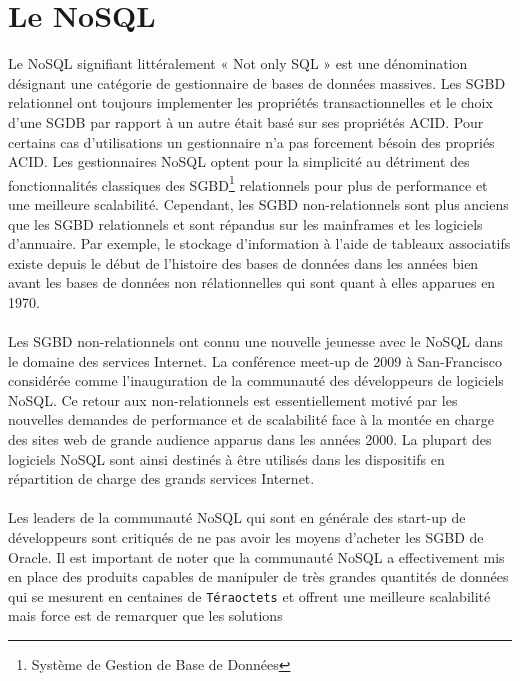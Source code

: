 \section{Le \textsf{NoSQL}}

Le \textsf{NoSQL} signifiant littéralement « \textsf{Not only SQL} » est une
dénomination désignant une catégorie de gestionnaire de bases de
données massives. Les SGBD relationnel ont toujours implementer les propriétés transactionnelles et le choix d'une SGDB par rapport à un autre était basé sur ses propriétés ACID. Pour certains cas d'utilisations un gestionnaire n'a pas forcement bésoin des propriés ACID. Les gestionnaires \textsf{NoSQL} optent pour la
simplicité au détriment des fonctionnalités classiques des
\textsf{SGBD}\footnote{Système de Gestion de Base de Données}
relationnels pour plus de performance et une meilleure
scalabilité. Cependant, les \textsf{SGBD} non-relationnels
sont plus anciens que les \textsf{SGBD} relationnels et sont répandus
sur les mainframes et les logiciels d'annuaire. Par exemple, le
stockage d'information à l'aide de tableaux associatifs existe depuis
le début de l'histoire des bases de données dans les années bien avant les bases de données non rélationnelles qui sont quant à elles apparues en 1970.  \\ \\ 
Les
\textsf{SGBD} non-relationnels ont connu une nouvelle jeunesse avec le
\textsf{NoSQL} dans le domaine des services \textsf{Internet}. La conférence meet-up de 2009 à \textsf{San-Francisco} considérée comme
l'inauguration de la communauté des développeurs de logiciels
\textsf{NoSQL}. Ce
retour aux non-relationnels est essentiellement motivé par les
nouvelles demandes de performance et de scalabilité face à la montée en charge des sites web de grande audience
apparus dans les années 2000. La plupart des logiciels \textsf{NoSQL}
sont ainsi destinés à être utilisés dans les dispositifs en répartition de
charge des grands services \textsf{Internet}.  
\\ \\ 
Les leaders de la communauté \textsf{NoSQL} qui sont en générale des \textsf{start-up} de développeurs sont critiqués de ne pas avoir les moyens d'acheter les
\textsf{SGBD} de Oracle. Il est important de noter que
la communauté \textsf{NoSQL} a effectivement mis en place des produits
capables de manipuler de très grandes quantités de données qui se
mesurent en centaines de \texttt{Téraoctets} et offrent une meilleure
scalabilité mais force est de remarquer que les solutions
